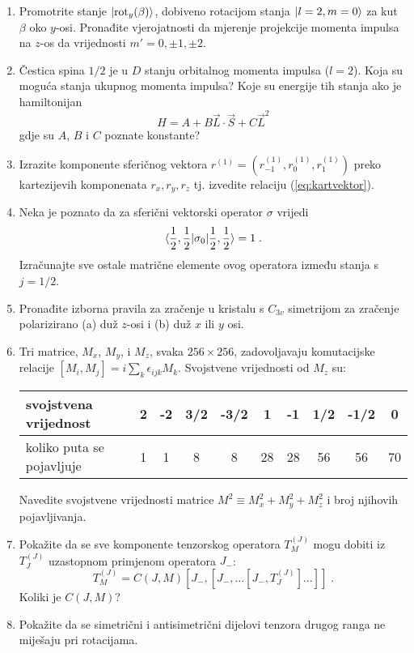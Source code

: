 \begin{enumerate}[{6}.1]
\item
Promotrite stanje $| \text{rot}_y(\beta) \rangle$, dobiveno rotacijom stanja
$| l=2, m=0 \rangle$ za kut $\beta$ oko $y$-osi. Pronađite vjerojatnosti da
mjerenje projekcije momenta impulsa na $z$-os da vrijednosti
$m'=0,\pm 1, \pm 2$.

\item Čestica spina $1/2$ je u $D$ stanju orbitalnog momenta impulsa
($l=2$). Koja su moguća stanja ukupnog momenta impulsa? Koje su energije
tih stanja ako je hamiltonijan 
\[ H = A + B \vec{L}\cdot\vec{S} + C \vec{L}^2 \]
gdje su $A$, $B$ i $C$ poznate konstante?

\item
Izrazite komponente sferičnog vektora $r^{(1)} = (r^{(1)}_{-1}, r^{(1)}_{0},
r^{(1)}_{1})$ preko kartezijevih komponenata $r_x, r_y, r_z$ tj. izvedite
relaciju (\ref{eq:kartvektor}).

\item Neka je poznato da za sferični vektorski operator $\sigma$ vrijedi
\[  \langle \frac{1}{2}, \frac{1}{2} | \sigma_0 | \frac{1}{2}, \frac{1}{2} \rangle = 1 \;. \]
Izračunajte sve ostale matrične elemente ovog operatora između stanja
s $j = 1/2$.

\item Pronađite izborna pravila za zračenje u kristalu s $C_{3v}$
simetrijom za zračenje polarizirano (a) duž $z$-osi i (b) duž
$x$ ili $y$ osi. 

\item 
Tri matrice, $M_x$, $M_y$, i $M_z$, svaka $256\times 256$, zadovoljavaju
komutacijske relacije $[M_i, M_j] = i \sum_{k} \epsilon_{ijk} M_k$.
Svojstvene vrijednosti od $M_z$ su:
\begin{center}
\begin{tabular}[h]{l|ccccccccc}
\hline
svojstvena vrijednost & 2 & -2 & 3/2 & -3/2 & 1 & -1 & 1/2 & -1/2 & 0 \\ \hline
koliko puta se pojavljuje & 1 & 1 & 8 & 8 & 28 & 28 & 56 & 56 & 70 \\ \hline
\end{tabular}
\end{center}
Navedite svojstvene vrijednosti matrice $M^2 \equiv M_{x}^2 + M_{y}^2 + M_{z}^2$
i broj njihovih pojavljivanja.

\item Pokažite da se sve komponente tenzorskog operatora 
$T^{(J)}_M$ mogu dobiti iz $T^{(J)}_J$ uzastopnom primjenom operatora $J_-$:
\[ T^{(J)}_M = C(J,M) [J_-, [J_-, \dots [J_-, T^{(J)}_J]. . .]] \;. \]
Koliki je $C(J,M)$?

\item \label{zad:antisim} Pokažite da se simetrični i antisimetrični
dijelovi tenzora drugog ranga ne miješaju pri rotacijama.

\end{enumerate}

